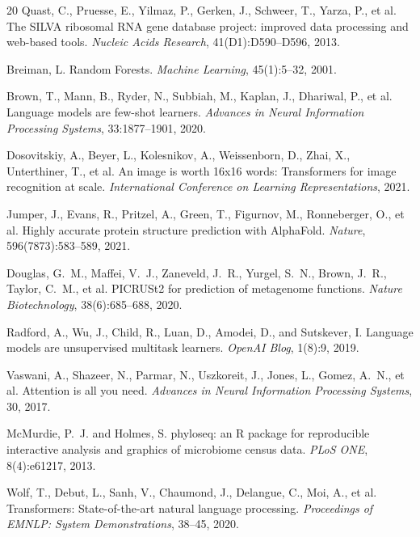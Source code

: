 \documentclass[11pt,a4paper]{article}
\begin{document}
\begin{thebibliography}{20}
Quast, C., Pruesse, E., Yilmaz, P., Gerken, J., Schweer, T., Yarza, P., et al.
\newblock The SILVA ribosomal RNA gene database project: improved data processing and web-based tools.
\newblock \emph{Nucleic Acids Research}, 41(D1):D590--D596, 2013.

Breiman, L.
\newblock Random Forests.
\newblock \emph{Machine Learning}, 45(1):5--32, 2001.

Brown, T., Mann, B., Ryder, N., Subbiah, M., Kaplan, J., Dhariwal, P., et al.
\newblock Language models are few-shot learners.
\newblock \emph{Advances in Neural Information Processing Systems}, 33:1877--1901, 2020.

Dosovitskiy, A., Beyer, L., Kolesnikov, A., Weissenborn, D., Zhai, X., Unterthiner, T., et al.
\newblock An image is worth 16x16 words: Transformers for image recognition at scale.
\newblock \emph{International Conference on Learning Representations}, 2021.

Jumper, J., Evans, R., Pritzel, A., Green, T., Figurnov, M., Ronneberger, O., et al.
\newblock Highly accurate protein structure prediction with AlphaFold.
\newblock \emph{Nature}, 596(7873):583--589, 2021.

Douglas, G.~M., Maffei, V.~J., Zaneveld, J.~R., Yurgel, S.~N., Brown, J.~R., Taylor, C.~M., et al.
\newblock PICRUSt2 for prediction of metagenome functions.
\newblock \emph{Nature Biotechnology}, 38(6):685--688, 2020.

Radford, A., Wu, J., Child, R., Luan, D., Amodei, D., and Sutskever, I.
\newblock Language models are unsupervised multitask learners.
\newblock \emph{OpenAI Blog}, 1(8):9, 2019.

Vaswani, A., Shazeer, N., Parmar, N., Uszkoreit, J., Jones, L., Gomez, A.~N., et al.
\newblock Attention is all you need.
\newblock \emph{Advances in Neural Information Processing Systems}, 30, 2017.

McMurdie, P.~J. and Holmes, S.
\newblock phyloseq: an R package for reproducible interactive analysis and graphics of microbiome census data.
\newblock \emph{PLoS ONE}, 8(4):e61217, 2013.

Wolf, T., Debut, L., Sanh, V., Chaumond, J., Delangue, C., Moi, A., et al.
\newblock Transformers: State-of-the-art natural language processing.
\newblock \emph{Proceedings of EMNLP: System Demonstrations}, 38--45, 2020.

\end{thebibliography}
\end{document}
